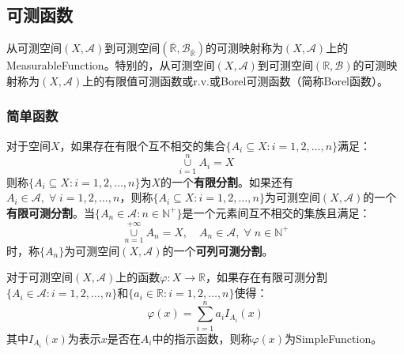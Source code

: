 \subsection{可测函数}
\begin{definition}
	从可测空间$(X,\mathscr{A})$到可测空间$(\overline{\mathbb{R}},\mathcal{B}_{\overline{\mathbb{R}}})$的可测映射称为$(X,\mathscr{A})$上的\gls{MeasurableFunction}。特别的，从可测空间$(X,\mathscr{A})$到可测空间$(\mathbb{R},\mathcal{B})$的可测映射称为$(X,\mathscr{A})$上的有限值可测函数或\gls{r.v.}或Borel可测函数（简称Borel函数）。
\end{definition}
\subsubsection{简单函数}
\begin{definition}
	对于空间$X$，如果存在有限个互不相交的集合$\{A_i\subseteq X:i=1,2,\dots,n\}$满足：
	\begin{equation*}
		\underset{i=1}{\overset{n}{\cup}}A_i=X
	\end{equation*}
	则称$\{A_i\subseteq X:i=1,2,\dots,n\}$为$X$的一个\textbf{有限分割}。如果还有$A_i\in \mathscr{A},\;\forall\;i=1,2,\dots,n$，则称$\{A_i\subseteq X:i=1,2,\dots,n\}$为可测空间$(X,\mathscr{A})$的一个\textbf{有限可测分割}。当$\{A_n\in\mathscr{A}:n\in\mathbb{N}^+\}$是一个元素间互不相交的集族且满足：
	\begin{equation*}
		\underset{n=1}{\overset{+\infty}{\cup}}A_n=X,\quad A_n\in\mathscr{A},\;\forall\;n\in\mathbb{N}^+
	\end{equation*}
	时，称$\{A_n\}$为可测空间$(X,\mathscr{A})$的一个\textbf{可列可测分割}。
\end{definition}
\begin{definition}
	对于可测空间$(X,\mathscr{A})$上的函数$\varphi:X\rightarrow \mathbb{R}$，如果存在有限可测分割$\{A_i\in \mathscr{A}:i=1,2,\dots,n\}$和$\{a_i\in\mathbb{R}:i=1,2,\dots,n\}$使得：
	\begin{equation*}
		\varphi(x)=\sum_{i=1}^{n}a_iI_{A_i}(x)
	\end{equation*}
	其中$I_{A_i}(x)$为表示$x$是否在$A_i$中的指示函数，则称$\varphi(x)$为\gls{SimpleFunction}。
\end{definition}
